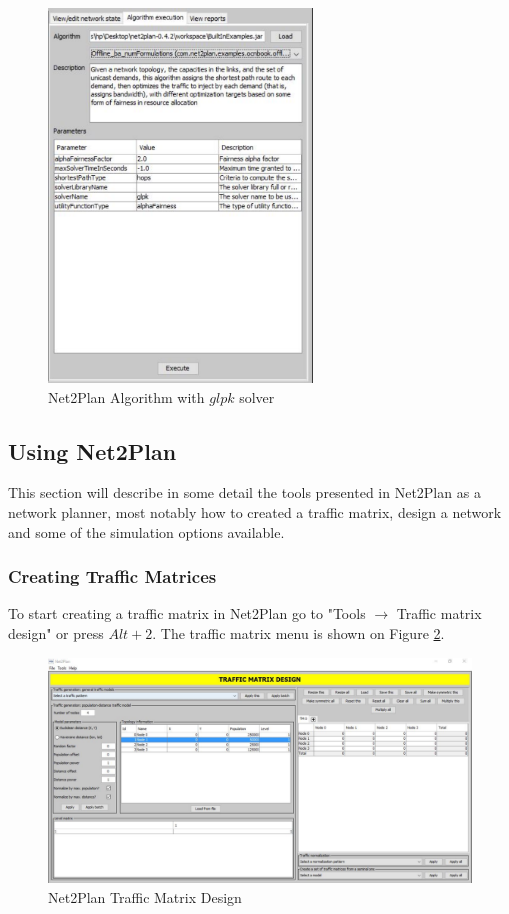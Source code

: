		
	\begin{figure}[h!]
		\centering
		\includegraphics[width = 7cm]{Net2Plan_glpk.pdf}
		\caption{Net2Plan Algorithm with $glpk$ solver}
		\label{Net2Plan_glpk}
	\end{figure}		
		   	
    \newpage

\subsection{Using Net2Plan}
This section will describe in some detail the tools presented in Net2Plan as a network planner, most notably how to created a traffic matrix, design a network and some of the simulation options available.

	\subsubsection{Creating Traffic Matrices}
    To start creating a traffic matrix in Net2Plan go to "Tools $\rightarrow$ Traffic matrix design" or press $Alt+2$. The traffic matrix menu is shown on Figure \ref{Net2Plan_traffic}.
	
	\begin{figure}[h!]
		\vspace{-0.3cm}
		\centering	
		\includegraphics[width = 16cm]{Net2Plan_traffic.pdf}
		\caption{Net2Plan Traffic Matrix Design}
		\label{Net2Plan_traffic}
	\end{figure}
		
